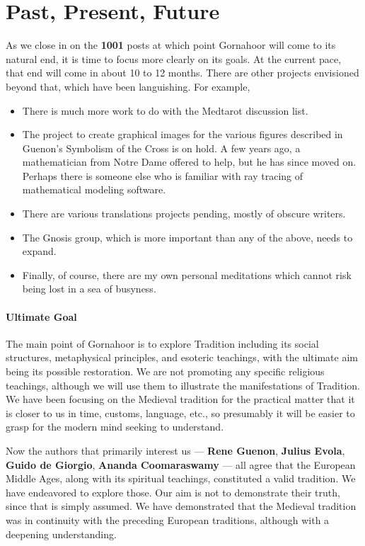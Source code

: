\section{Past, Present, Future}

As we close in on the \textbf{1001} posts at which point Gornahoor will come to its natural end, it is time to focus more clearly on its goals. At the current pace, that end will come in about 10 to 12 months. There are other projects envisioned beyond that, which have been languishing. For example,

\begin{itemize}
\item There is much more work to do with the Medtarot discussion list.

\item The project to create graphical images for the various figures described in Guenon's Symbolism of the Cross is on hold. A few years ago, a mathematician from Notre Dame offered to help, but he has since moved on. Perhaps there is someone else who is familiar with ray tracing of mathematical modeling software.

\item There are various translations projects pending, mostly of obscure writers.

\item The Gnosis group, which is more important than any of the above, needs to expand.

\item Finally, of course, there are my own personal meditations which cannot risk being lost in a sea of busyness.
\end{itemize}


\paragraph{Ultimate Goal}


The main point of Gornahoor is to explore Tradition including its social structures, metaphysical principles, and esoteric teachings, with the ultimate aim being its possible restoration. We are not promoting any specific religious teachings, although we will use them to illustrate the manifestations of Tradition. We have been focusing on the Medieval tradition for the practical matter that it is closer to us in time, customs, language, etc., so presumably it will be easier to grasp for the modern mind seeking to understand.

Now the authors that primarily interest us --- \textbf{Rene Guenon}, \textbf{Julius Evola}, \textbf{Guido de Giorgio}, \textbf{Ananda Coomaraswamy} --- all agree that the European Middle Ages, along with its spiritual teachings, constituted a valid tradition. We have endeavored to explore those. Our aim is not to demonstrate their truth, since that is simply assumed. We have demonstrated that the Medieval tradition was in continuity with the preceding European traditions, although with a deepening understanding.

